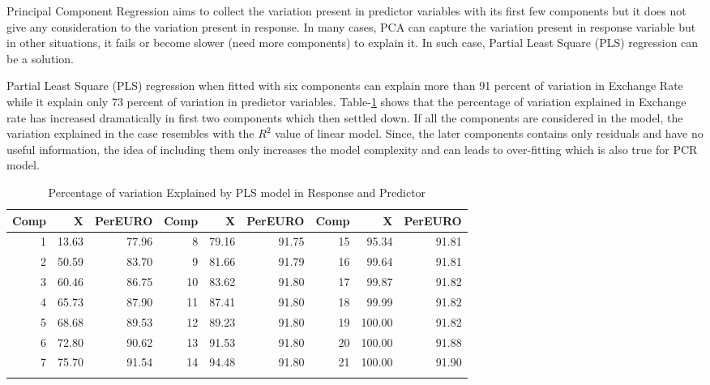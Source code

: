 \documentclass[12pt, lot, lof]{thesis}\usepackage[]{graphicx}\usepackage[]{color}
\begin{document}
Principal Component Regression aims to collect the variation present in predictor variables with its first few components but it does not give any consideration to the variation present in response. In many cases, PCA can capture the variation present in response variable but in other situations, it fails or become slower (need more components) to explain it. In such case, Partial Least Square (PLS) regression can be a solution.

Partial Least Square (PLS) regression when fitted with six components can explain more than 91 percent of variation in Exchange Rate while it explain only 73 percent of variation in predictor variables. Table-\ref{tab:plsSumry} shows that the percentage of variation explained in Exchange rate has increased dramatically in first two components which then settled down. If all the components are considered in the model, the variation explained in the case resembles with the $R^2$ value of linear model. Since, the later components contains only residuals and have no useful information, the idea of including them only increases the model complexity and can leads to over-fitting which is also true for PCR model.

{\singlespacing\sffamily
{\footnotesize
\begin{longtable}{rrr|rrr|rrr}
\caption{Percentage of variation Explained by PLS model in Response and Predictor} \\ 
  \hline
Comp & X & PerEURO & Comp & X & PerEURO & Comp & X & PerEURO \\ 
  \hline
  1 & 13.63 & 77.96 &   8 & 79.16 & 91.75 &  15 & 95.34 & 91.81 \\ 
    2 & 50.59 & 83.70 &   9 & 81.66 & 91.79 &  16 & 99.64 & 91.81 \\ 
    3 & 60.46 & 86.75 &  10 & 83.62 & 91.80 &  17 & 99.87 & 91.82 \\ 
    4 & 65.73 & 87.90 &  11 & 87.41 & 91.80 &  18 & 99.99 & 91.82 \\ 
    5 & 68.68 & 89.53 &  12 & 89.23 & 91.80 &  19 & 100.00 & 91.82 \\ 
    6 & 72.80 & 90.62 &  13 & 91.53 & 91.80 &  20 & 100.00 & 91.88 \\ 
    7 & 75.70 & 91.54 &  14 & 94.48 & 91.80 &  21 & 100.00 & 91.90 \\ 
   \hline
\hline
\label{tab:plsSumry}
\end{longtable}
}

}
\end{document}
